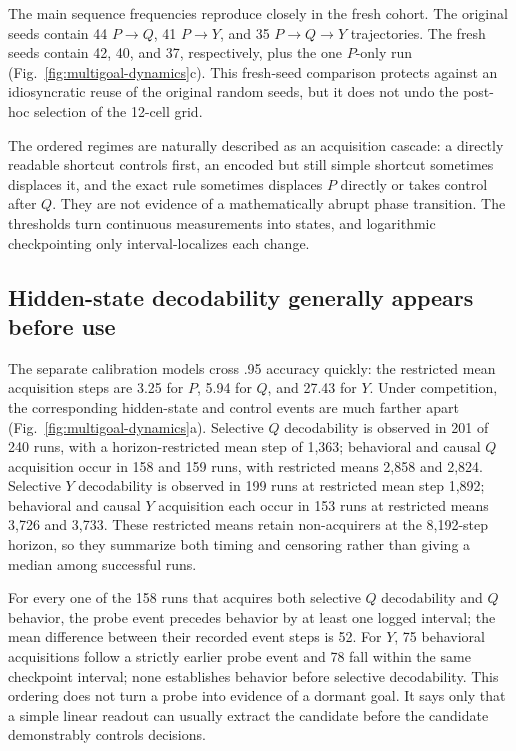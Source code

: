 \documentclass[11pt,a4paper]{article}
\newcommand{\fig}[1]{Fig.~\ref{#1}}
\begin{document}
The main sequence frequencies reproduce closely in the fresh cohort. The original seeds contain 44 $P\mathbin{\to}Q$, 41 $P\mathbin{\to}Y$, and 35 $P\mathbin{\to}Q\mathbin{\to}Y$ trajectories. The fresh seeds contain 42, 40, and 37, respectively, plus the one $P$-only run (\fig{fig:multigoal-dynamics}c). This fresh-seed comparison protects against an idiosyncratic reuse of the original random seeds, but it does not undo the post-hoc selection of the 12-cell grid.

The ordered regimes are naturally described as an acquisition cascade: a directly readable shortcut controls first, an encoded but still simple shortcut sometimes displaces it, and the exact rule sometimes displaces $P$ directly or takes control after $Q$. They are not evidence of a mathematically abrupt phase transition. The thresholds turn continuous measurements into states, and logarithmic checkpointing only interval-localizes each change.

\subsection*{Hidden-state decodability generally appears before use}

The separate calibration models cross .95 accuracy quickly: the restricted mean acquisition steps are 3.25 for $P$, 5.94 for $Q$, and 27.43 for $Y$. Under competition, the corresponding hidden-state and control events are much farther apart (\fig{fig:multigoal-dynamics}a). Selective $Q$ decodability is observed in 201 of 240 runs, with a horizon-restricted mean step of 1,363; behavioral and causal $Q$ acquisition occur in 158 and 159 runs, with restricted means 2,858 and 2,824. Selective $Y$ decodability is observed in 199 runs at restricted mean step 1,892; behavioral and causal $Y$ acquisition each occur in 153 runs at restricted means 3,726 and 3,733. These restricted means retain non-acquirers at the 8,192-step horizon, so they summarize both timing and censoring rather than giving a median among successful runs.

For every one of the 158 runs that acquires both selective $Q$ decodability and $Q$ behavior, the probe event precedes behavior by at least one logged interval; the mean difference between their recorded event steps is 52. For $Y$, 75 behavioral acquisitions follow a strictly earlier probe event and 78 fall within the same checkpoint interval; none establishes behavior before selective decodability. This ordering does not turn a probe into evidence of a dormant goal. It says only that a simple linear readout can usually extract the candidate before the candidate demonstrably controls decisions.
\end{document}

